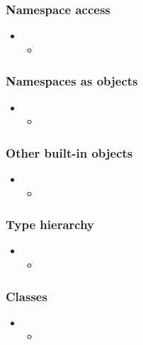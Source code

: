 \begin{frame}[fragile]
%
  \frametitle{Namespace access}
%
  \begin{itemize}
%
  \item 
    \begin{itemize}
    \item
    \end{itemize}
%
  \end{itemize}
%
\end{frame}

\begin{frame}[fragile]
%
  \frametitle{Namespaces as objects}
%
  \begin{itemize}
%
  \item 
    \begin{itemize}
    \item
    \end{itemize}
%
  \end{itemize}
%
\end{frame}

\begin{frame}[fragile]
%
  \frametitle{Other built-in objects}
%
  \begin{itemize}
%
  \item 
    \begin{itemize}
    \item
    \end{itemize}
%
  \end{itemize}
%
\end{frame}

\begin{frame}[fragile]
%
  \frametitle{Type hierarchy}
%
  \begin{itemize}
%
  \item 
    \begin{itemize}
    \item
    \end{itemize}
%
  \end{itemize}
%
\end{frame}

\begin{frame}[fragile]
%
  \frametitle{Classes}
%
  \begin{itemize}
%
  \item 
    \begin{itemize}
    \item
    \end{itemize}
%
  \end{itemize}
%
\end{frame}

